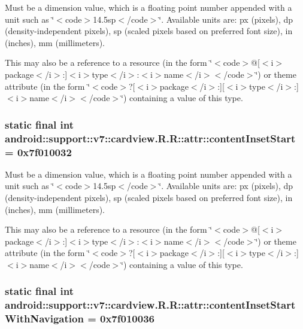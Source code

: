Must be a dimension value, which is a floating point number appended with a unit such as \char`\"{}$<$code$>$14.5sp$<$/code$>$\char`\"{}. Available units are: px (pixels), dp (density-independent pixels), sp (scaled pixels based on preferred font size), in (inches), mm (millimeters). 

This may also be a reference to a resource (in the form \char`\"{}$<$code$>$@\mbox{[}$<$i$>$package$<$/i$>$:\mbox{]}$<$i$>$type$<$/i$>$:$<$i$>$name$<$/i$>$$<$/code$>$\char`\"{}) or theme attribute (in the form \char`\"{}$<$code$>$?\mbox{[}$<$i$>$package$<$/i$>$:\mbox{]}\mbox{[}$<$i$>$type$<$/i$>$:\mbox{]}$<$i$>$name$<$/i$>$$<$/code$>$\char`\"{}) containing a value of this type. \hypertarget{classandroid_1_1support_1_1v7_1_1cardview_1_1_r_1_1attr_b367a637f46d5b03063b163a03f78f72}{
\subsubsection[{contentInsetStart}]{\setlength{\rightskip}{0pt plus 5cm}static final int android::support::v7::cardview.R.R::attr::contentInsetStart = 0x7f010032}}
\label{classandroid_1_1support_1_1v7_1_1cardview_1_1_r_1_1attr_b367a637f46d5b03063b163a03f78f72}


Must be a dimension value, which is a floating point number appended with a unit such as \char`\"{}$<$code$>$14.5sp$<$/code$>$\char`\"{}. Available units are: px (pixels), dp (density-independent pixels), sp (scaled pixels based on preferred font size), in (inches), mm (millimeters). 

This may also be a reference to a resource (in the form \char`\"{}$<$code$>$@\mbox{[}$<$i$>$package$<$/i$>$:\mbox{]}$<$i$>$type$<$/i$>$:$<$i$>$name$<$/i$>$$<$/code$>$\char`\"{}) or theme attribute (in the form \char`\"{}$<$code$>$?\mbox{[}$<$i$>$package$<$/i$>$:\mbox{]}\mbox{[}$<$i$>$type$<$/i$>$:\mbox{]}$<$i$>$name$<$/i$>$$<$/code$>$\char`\"{}) containing a value of this type. \hypertarget{classandroid_1_1support_1_1v7_1_1cardview_1_1_r_1_1attr_32bf03a5f3de77b1c91a560319b49b20}{
\subsubsection[{contentInsetStartWithNavigation}]{\setlength{\rightskip}{0pt plus 5cm}static final int android::support::v7::cardview.R.R::attr::contentInsetStartWithNavigation = 0x7f010036}}
\label{classandroid_1_1support_1_1v7_1_1cardview_1_1_r_1_1attr_32bf03a5f3de77b1c91a560319b49b20}


